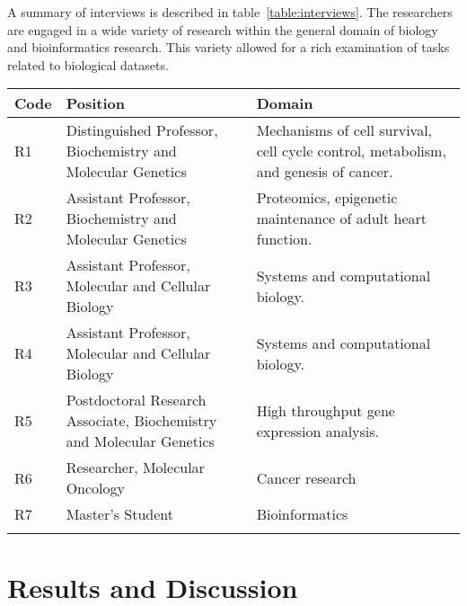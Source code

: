 \documentclass[twocolumn]{bmcart}%
\begin{document}
A summary of interviews is described in table~\ref{table:interviews}.
The researchers are engaged in a wide variety of research within the general domain of biology and bioinformatics research. This variety allowed for a rich examination of tasks related to biological datasets.

\begin{table*}[!ht]
 \caption{Researchers Interviewed}
 \begin{center}
   \begin{tabular}{p{0.5cm}p{5cm}p{10cm}}
     Code & Position & Domain \\
   \hline
     R1
     & Distinguished Professor, \newline Biochemistry and Molecular Genetics
     & Mechanisms of cell survival, cell cycle control, metabolism, and genesis of cancer.
     \\ %
     R2
     & Assistant Professor, \newline Biochemistry and Molecular Genetics
     & Proteomics, epigenetic maintenance of adult heart function.
     \\ %
     R3
     & Assistant Professor, \newline Molecular and Cellular Biology
     & Systems and computational biology.
     \\ %
     R4
     & Assistant Professor, \newline Molecular and Cellular Biology
     & Systems and computational biology.
     \\ %
     R5
     & Postdoctoral Research Associate, \newline Biochemistry and Molecular Genetics
     & High throughput gene expression analysis.
     \\ %
     R6
     & Researcher, \newline Molecular Oncology
     & Cancer research
     \\ %
     R7
     & Master's Student
     & Bioinformatics
     \\ %
    \label{table:interviews}
   \end{tabular}
 \end{center}
\end{table*}

\section*{Results and Discussion}
\end{document}
